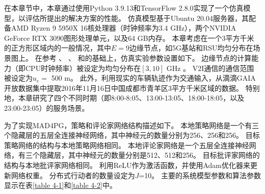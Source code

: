 在本章节中，本章通过使用Python 3.9.13和TensorFlow 2.8.0实现了一个仿真模型，以评估所提出的解决方案的性能。
仿真模型基于Ubuntu 20.04服务器，其配备AMD Ryzen 9 5950X 16核处理器（时钟频率为3.4 GHz），两个NVIDIA GeForce RTX 3090图形处理单元，以及64 GB内存。
本章考虑在一个3平方千米的正方形区域内的一般情况，其中$E=9$边缘节点，如5G基站和RSU均匀分布在场景图上。
在参考 、 、 和的基础上，仿真实验参数设置如下。
边缘节点的计算能力（即CPU时钟频率）被设定为均匀分布在$[3, 10]$ GHz \cite{zhou2019computation}。 
V2I通信的通信范围被设定为$u_e =$ 500 m\cite{zhu2021decentralized}。
此外，利用现实的车辆轨迹作为交通输入，从滴滴GAIA开放数据集中提取2016年11月16日中国成都市青羊区3平方千米区域的数据。
特别地，本章研究了四个不同时期（即8:00-8:05、13:00-13:05、18:00-18:05，以及23:00-23:05）的服务场景。

为了实现MAD4PG，策略和评论家网络结构描述如下。
本地策略网络是一个有三个隐藏层的五层全连接神经网络，其中神经元的数量分别为256、256和256。
目标策略网络的结构与本地策略网络相同。
本地评论家网络是一个五层全连接神经网络，有三个隐藏层，其中神经元的数量分别是512、512和256。
目标批评家网络的结构与本地批评家网络相同。
利用ReLU作为激活函数，并使用Adam优化器来更新网络权重。
分布式行动者的数量设定为$J$=10。
主要的系统模型参数和算法参数显示在表\ref{table 4-1}和\ref{table 4-2}中。

\begin{table}[h]\small
\centering
{}
\label{table 4-1}
\end{table}

